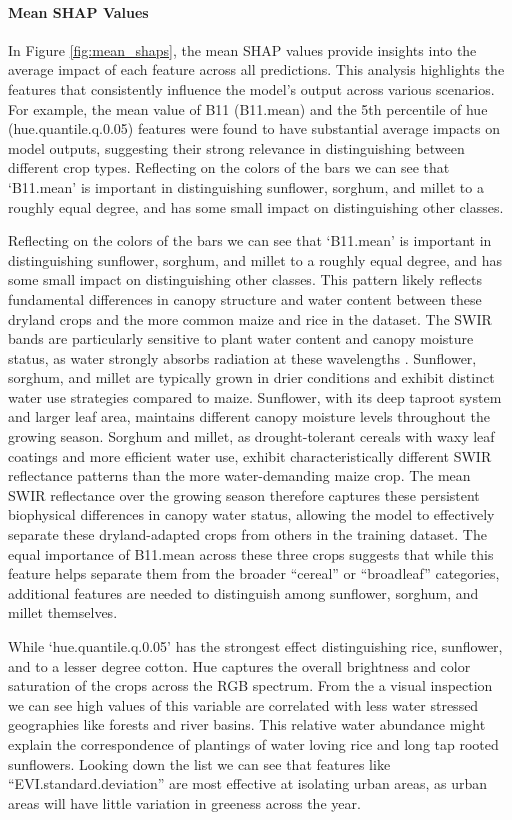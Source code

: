 \documentclass[
  journal,
  twocolumn]{IEEEtran}
\begin{document}
\paragraph{Mean SHAP Values}\label{mean-shap-values}

In Figure \ref{fig:mean_shaps}, the mean SHAP values provide insights
into the average impact of each feature across all predictions. This
analysis highlights the features that consistently influence the model's
output across various scenarios. For example, the mean value of B11
(B11.mean) and the 5th percentile of hue (hue.quantile.q.0.05) features
were found to have substantial average impacts on model outputs,
suggesting their strong relevance in distinguishing between different
crop types. Reflecting on the colors of the bars we can see that
`B11.mean' is important in distinguishing sunflower, sorghum, and millet
to a roughly equal degree, and has some small impact on distinguishing
other classes.

Reflecting on the colors of the bars we can see that `B11.mean' is
important in distinguishing sunflower, sorghum, and millet to a roughly
equal degree, and has some small impact on distinguishing other classes.
This pattern likely reflects fundamental differences in canopy structure
and water content between these dryland crops and the more common maize
and rice in the dataset. The SWIR bands are particularly sensitive to
plant water content and canopy moisture status, as water strongly
absorbs radiation at these wavelengths \citep{rs13173371}. Sunflower,
sorghum, and millet are typically grown in drier conditions and exhibit
distinct water use strategies compared to maize. Sunflower, with its
deep taproot system and larger leaf area, maintains different canopy
moisture levels throughout the growing season. Sorghum and millet, as
drought-tolerant cereals with waxy leaf coatings and more efficient
water use, exhibit characteristically different SWIR reflectance
patterns than the more water-demanding maize crop. The mean SWIR
reflectance over the growing season therefore captures these persistent
biophysical differences in canopy water status, allowing the model to
effectively separate these dryland-adapted crops from others in the
training dataset. The equal importance of B11.mean across these three
crops suggests that while this feature helps separate them from the
broader ``cereal'' or ``broadleaf'' categories, additional features are
needed to distinguish among sunflower, sorghum, and millet themselves.

While `hue.quantile.q.0.05' has the strongest effect distinguishing
rice, sunflower, and to a lesser degree cotton. Hue captures the overall
brightness and color saturation of the crops across the RGB spectrum.
From the a visual inspection we can see high values of this variable are
correlated with less water stressed geographies like forests and river
basins. This relative water abundance might explain the correspondence
of plantings of water loving rice and long tap rooted sunflowers.
Looking down the list we can see that features like
``EVI.standard.deviation'' are most effective at isolating urban areas,
as urban areas will have little variation in greeness across the year.
\end{document}
